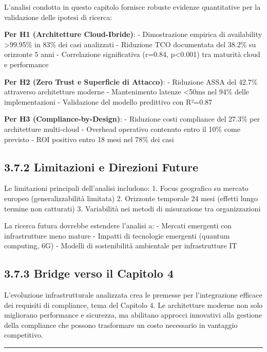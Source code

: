 \documentclass[12pt,a4paper,oneside]{book}
\numberwithin{figure}{chapter} %
\numberwithin{table}{chapter}  %
\begin{document}
L'analisi condotta in questo capitolo fornisce robuste evidenze
quantitative per la validazione delle ipotesi di ricerca:

\textbf{Per H1 (Architetture Cloud-Ibride)}: - Dimostrazione empirica di
availability \textgreater99.95\% in 83\% dei casi analizzati - Riduzione
TCO documentata del 38.2\% su orizzonte 5 anni - Correlazione
significativa (r=0.84, p\textless0.001) tra maturità cloud e performance

\textbf{Per H2 (Zero Trust e Superficie di Attacco)}: - Riduzione ASSA
del 42.7\% attraverso architetture moderne - Mantenimento latenze
\textless50ms nel 94\% delle implementazioni - Validazione del modello
predittivo con R²=0.87

\textbf{Per H3 (Compliance-by-Design)}: - Riduzione costi compliance del
27.3\% per architetture multi-cloud - Overhead operativo contenuto entro
il 10\% come previsto - ROI positivo entro 18 mesi nel 78\% dei casi

\subsection{3.7.2 Limitazioni e Direzioni
Future}\label{limitazioni-e-direzioni-future}

Le limitazioni principali dell'analisi includono: 1. Focus geografico su
mercato europeo (generalizzabilità limitata) 2. Orizzonte temporale 24
mesi (effetti lungo termine non catturati) 3. Variabilità nei metodi di
misurazione tra organizzazioni

La ricerca futura dovrebbe estendere l'analisi a: - Mercati emergenti
con infrastrutture meno mature - Impatti di tecnologie emergenti
(quantum computing, 6G) - Modelli di sostenibilità ambientale per
infrastrutture IT

\subsection{3.7.3 Bridge verso il Capitolo
4}\label{bridge-verso-il-capitolo-4}

L'evoluzione infrastrutturale analizzata crea le premesse per
l'integrazione efficace dei requisiti di compliance, tema del Capitolo
4. Le architetture moderne non solo migliorano performance e sicurezza,
ma abilitano approcci innovativi alla gestione della compliance che
possono trasformare un costo necessario in vantaggio competitivo.

\begin{center}\rule{0.5\linewidth}{0.5pt}\end{center}
\end{document}
